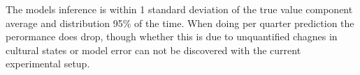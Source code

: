The models inference is within 1 standard deviation of the true value component average and distribution 95\% of the time. When doing per quarter prediction the perormance does drop, though whether this is due to unquantified chagnes in cultural states or model error can not be discovered with the current experimental setup.
